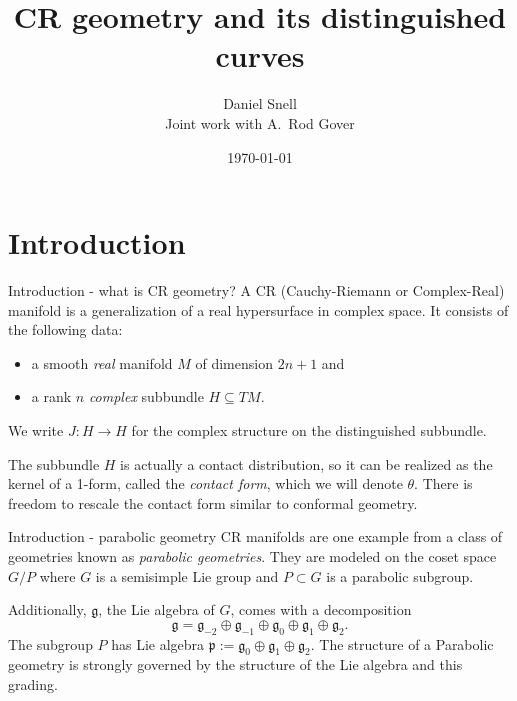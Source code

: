 \documentclass{beamer}
\title{CR geometry and its distinguished curves}
\author[Daniel Snell]{Daniel Snell\\{ \bigskip\bigskip \small Joint work with
A.\ Rod Gover}}
\date{\today}
\newcommand{\CC}{\mathbb{C}}
\begin{document}
\begin{frame}
  \titlepage
\end{frame}

\section{Introduction}
\begin{frame}{Introduction - what is CR geometry?}
  A CR (Cauchy-Riemann or Complex-Real) manifold is a generalization of a real
  hypersurface in complex space.
  \vfill
  \pause
  It consists of the following data:
  \begin{itemize}
    \item a smooth \emph{real} manifold $M$ of dimension $2n+1$ and
      \pause
    \item a rank $n$ \emph{complex} subbundle $H \subseteq TM$.
  \end{itemize}
  \pause
  \vfill
  We write $J : H \to H$ for the complex structure on the distinguished subbundle. 

  \vfill
  \pause 
  The subbundle $H$ is actually a contact distribution, so it can be realized as the kernel
  of a 1-form, called the \emph{contact form}, which we will denote $\theta$.
  There is freedom to rescale the contact form similar to conformal geometry.

\end{frame}

\begin{frame}{Introduction - parabolic geometry}
  CR manifolds are one example from a class of geometries known as
  \emph{parabolic geometries}.
  They are modeled on the coset space $G/P$ where $G$ is a semisimple Lie
  group and $P \subset G$ is a parabolic subgroup.
  \pause
  \vfill

  Additionally, $\mathfrak{g}$, the Lie algebra of $G$, comes with a decomposition
  \[
    \mathfrak{g} = \mathfrak{g}_{-2} \oplus \mathfrak{g}_{-1}\oplus
    \mathfrak{g}_{0}\oplus\mathfrak{g}_{1}\oplus \mathfrak{g}_{2}.
  \]
  The subgroup $P$ has Lie algebra $\mathfrak{p} :=
  \mathfrak{g}_{0}\oplus\mathfrak{g}_{1}\oplus \mathfrak{g}_{2}$.
  \pause
  \vfill
  The structure of a Parabolic geometry is strongly governed by the structure
  of the Lie algebra and this grading.
\end{frame}
\end{document}
